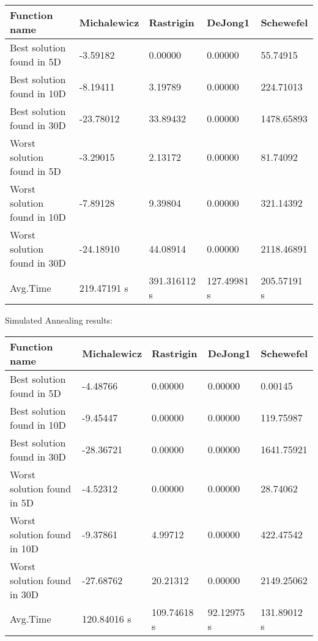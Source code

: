 \documentclass[10pt]{article}
\begin{document}
\begin{center}
\begin{tabular}{|l|l|l|l|l|}
\hline
Function name & Michalewicz & Rastrigin & DeJong1 & Schewefel \\
\hline
Best solution found in 5D & -3.59182 & 0.00000 & 0.00000 & 55.74915 \\
\hline
Best solution found in 10D & -8.19411 & 3.19789 & 0.00000 & 224.71013 \\
\hline
Best solution found in 30D & -23.78012 & 33.89432 & 0.00000 & 1478.65893 \\
\hline
Worst solution found in 5D & -3.29015 & 2.13172 & 0.00000 & 81.74092 \\
\hline
Worst solution found in 10D & -7.89128 & 9.39804 & 0.00000 & 321.14392 \\
\hline
Worst solution found in 30D & -24.18910 & 44.08914 & 0.00000 & 2118.46891 \\
\hline
Avg.Time & 219.47191 s & 391.316112 s & 127.49981 s & 205.57191 s \\
\hline
\end{tabular}
\end{center}

Simulated Annealing results:

\begin{center}
\begin{tabular}{|l|l|l|l|l|}
\hline
Function name & Michalewicz & Rastrigin & DeJong1 & Schewefel \\
\hline
Best solution found in 5D & -4.48766 & 0.00000 & 0.00000 & 0.00145 \\
\hline
Best solution found in 10D & -9.45447 & 0.00000 & 0.00000 & 119.75987 \\
\hline
Best solution found in 30D & -28.36721 & 0.00000 & 0.00000 & 1641.75921 \\
\hline
Worst solution found in 5D & -4.52312 & 0.00000 & 0.00000 & 28.74062 \\
\hline
Worst solution found in 10D & -9.37861 & 4.99712 & 0.00000 & 422.47542 \\
\hline
Worst solution found in 30D & -27.68762 & 20.21312 & 0.00000 & 2149.25062 \\
\hline
Avg.Time & 120.84016 s & 109.74618 s & 92.12975 s & 131.89012 s \\
\hline
\end{tabular}
\end{center}
\end{document}
